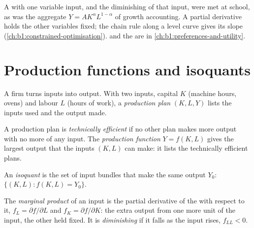 \begin{recall}
A  with one variable input, and the diminishing
 of that input, were met at school, as was the aggregate
 $Y = AK^\alpha L^{1-\alpha}$ of growth accounting. A partial
derivative holds the other variables fixed; the chain rule along a level
curve gives its slope (\cref{ch:b1:constrained-optimisation}).  and the  are in
\cref{ch:b1:preferences-and-utility}.
\end{recall}

\section{Production functions and isoquants}\label{sec:b1:technology:isoquants}

A firm turns inputs into output. With two inputs, capital $K$ (machine
hours, ovens) and labour $L$ (hours of work), a \emph{production plan}
$(K, L, Y)$ lists the inputs used and the output made.

\begin{definition}\label{def:b1:technology:production-function}
A production plan is \emph{technically efficient} if no other plan makes
more output with no more of any input. The \emph{production function}
$Y = f(K, L)$ gives the largest output that the inputs $(K, L)$ can make: it
lists the technically efficient plans.
\end{definition}

\begin{definition}[Isoquant]\label{def:b1:technology:isoquant}
An \emph{isoquant} is the set of input bundles that make the same output
$Y_0$: $\{(K, L) : f(K, L) = Y_0\}$.
\end{definition}

\begin{definition}\label{def:b1:technology:marginal-product}
The \emph{marginal product} of an input is the partial derivative of the
 with respect to it, $f_L = \partial f/\partial L$ and
$f_K = \partial f/\partial K$: the extra output from one more unit of the input,
the other held fixed. It is \emph{diminishing} if it falls as the input
rises, $f_{LL} < 0$.
\end{definition}

